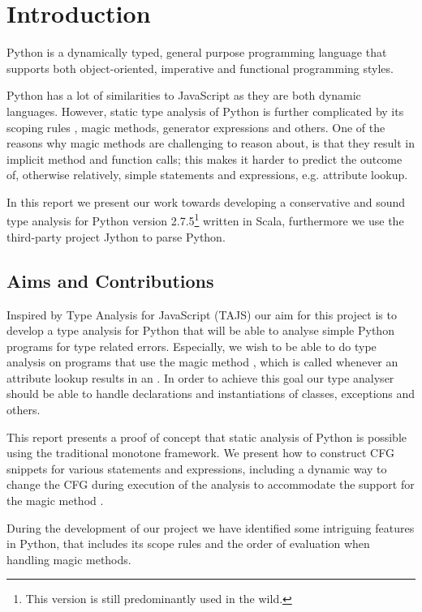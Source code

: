 \chapter{Introduction}
Python is a dynamically typed, general purpose programming language that supports both object-oriented, imperative and functional programming styles.

Python has a lot of similarities to JavaScript as they are both dynamic languages. However, static type analysis of Python is further complicated by its scoping rules \cite{lambdapy}, magic methods, generator expressions and others. One of the reasons why magic methods are challenging to reason about, is that they result in implicit method and function calls; this makes it harder to predict the outcome of, otherwise relatively, simple statements and expressions, e.g. attribute lookup.

In this report we present our work towards developing a conservative and sound type analysis for Python version 2.7.5\footnote{This version is still predominantly used in the wild.} written in Scala, furthermore we use the third-party project Jython \cite{jython} to parse Python.

\section{Aims and Contributions}
Inspired by Type Analysis for JavaScript (TAJS) \cite{tajs} our aim for this project is to develop a type analysis for Python that will be able to analyse simple Python programs for type related errors. Especially, we wish to be able to do type analysis on programs that use the magic method , which is called whenever an attribute lookup results in an . In order to achieve this goal our type analyser should be able to handle declarations and instantiations of classes, exceptions and others.

This report presents a proof of concept that static analysis of Python is possible using the traditional monotone framework. We present how to construct CFG snippets for various statements and expressions, including a dynamic way to change the CFG during execution of the analysis to accommodate the support for the magic method .  

During the development of our project we have identified some intriguing features in Python, that includes its scope rules and the order of evaluation when handling magic methods.

